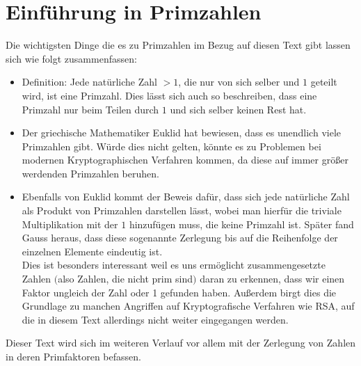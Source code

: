 	
	\section{Einf\"uhrung in Primzahlen} 
	\label{sec:primzahlen}
	Die wichtigsten Dinge die es zu Primzahlen im Bezug auf diesen Text gibt lassen sich wie folgt zusammenfassen:

	\begin{itemize}
		\item Definition: Jede nat\"urliche Zahl $>1$, die nur von sich selber und  $1$ geteilt wird, ist eine Primzahl. Dies l\"asst sich auch so beschreiben, dass eine Primzahl nur beim Teilen durch $1$ und sich selber keinen Rest hat.
		\item Der griechische Mathematiker Euklid hat bewiesen, dass es unendlich viele Primzahlen gibt. W\"urde dies nicht gelten, k\"onnte es zu Problemen bei modernen Kryptographischen Verfahren kommen, da diese auf immer gr\"o\ss er werdenden Primzahlen beruhen. 
		\item  Ebenfalls von Euklid kommt der Beweis daf\"ur, dass sich jede nat\"urliche Zahl als Produkt von Primzahlen darstellen l\"asst, wobei man hierf\"ur die triviale Multiplikation mit der $1$ hinzuf\"ugen muss, die keine Primzahl ist. Sp\"ater fand Gauss heraus, dass diese sogenannte Zerlegung bis auf die Reihenfolge der einzelnen Elemente eindeutig ist. \\
		Dies ist besonders interessant weil es uns erm\"oglicht zusammengesetzte Zahlen $($also Zahlen, die nicht prim sind$)$ daran zu erkennen, dass wir einen Faktor ungleich der Zahl oder 1 gefunden haben. Außerdem birgt dies die Grundlage zu manchen Angriffen auf Kryptografische Verfahren wie RSA, auf die in diesem Text allerdings nicht weiter eingegangen werden.
	\end{itemize}
	
	Dieser Text wird sich im weiteren Verlauf vor allem mit der Zerlegung von Zahlen in deren Primfaktoren befassen. 